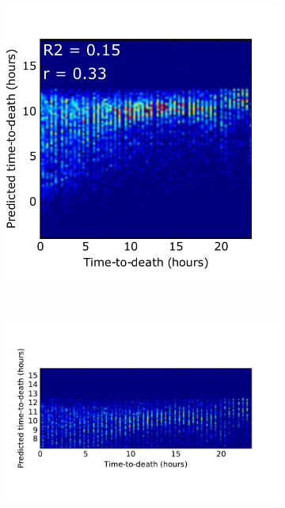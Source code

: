 \documentclass[pdftex,12pt,a4paper]{report}
\begin{document}
\begin{figure}[H]
\centering
\begin{subfigure}{.35\textwidth}
  \centering
  \includegraphics[width=\textwidth]{images/svm/pred_heatmap_full.pdf}
  \caption{}
  \label{fig:svm_pred_heatmap_full}
\end{subfigure}
~
\begin{subfigure}{.62\textwidth}
  \centering
  \includegraphics[width=\textwidth]{images/svm/pred_heatmap.pdf}
  \caption{}
  \label{fig:svm_pred_heatmap}
\end{subfigure}


\end{figure}
\end{document}
